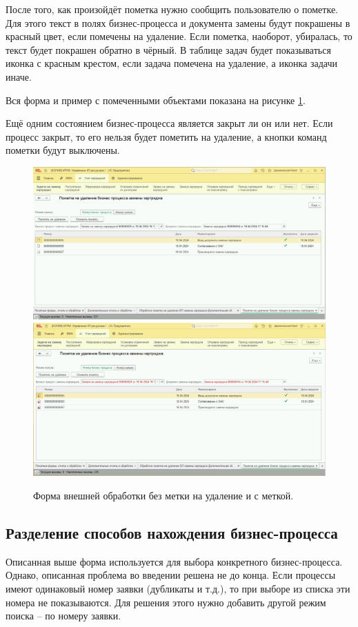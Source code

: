     После того, как произойдёт пометка нужно сообщить пользователю о пометке. Для этого текст в полях бизнес-процесса и документа замены будут покрашены в красный цвет, если помечены на удаление. Если пометка, наоборот, убиралась, то текст будет покрашен обратно в чёрный. В таблице задач будет показываться иконка с красным крестом, если задача помечена на удаление, а иконка задачи иначе.
    
    Вся форма и пример с помеченными объектами показана на рисунке \ref{form}.

    Ещё одним состоянием бизнес-процесса является закрыт ли он или нет. Если процесс закрыт, то его нельзя будет пометить на удаление, а кнопки команд пометки будут выключены.

    \begin{figure}[H]
        \centering
        \includegraphics[width=13cm]{pictures/interf.png}
        \includegraphics[width=13cm]{pictures/interf_marked.png}
        \caption{Форма внешней обработки без метки на удаление и с меткой.}  \label{form}
    \end{figure}

    \subsection{Разделение способов нахождения бизнес-процесса}
    Описанная выше форма используется для выбора конкретного бизнес-процесса. Однако, описанная проблема во введении решена не до конца. Если процессы имеют одинаковый номер заявки (дубликаты и т.д.), то при выборе из списка эти номера не показываются. Для решения этого нужно добавить другой режим поиска -- по номеру заявки.

